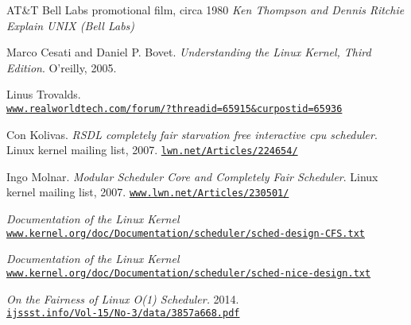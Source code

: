 \documentclass[10pt, oneside]{book}
\begin{document}
\frontmatter
\begin{titlepage}

\end{titlepage}

\tableofcontents
\listoffigures



\mainmatter







\begin{thebibliography}{}
AT\&T Bell Labs promotional film, circa 1980
\textit{Ken Thompson and Dennis Ritchie Explain UNIX (Bell Labs)} %

Marco Cesati and Daniel P. Bovet.
\textit{Understanding the Linux Kernel, Third Edition}.
O'reilly, 2005.

Linus Trovalds.\\
\href{https://www.realworldtech.com/forum/?threadid=65915\&curpostid=65936}{\texttt{www.realworldtech.com/forum/?threadid=65915\&curpostid=65936}}

Con Kolivas.
\textit{RSDL completely fair starvation free interactive cpu scheduler}.
Linux kernel mailing list, 2007.
\href{https://lwn.net/Articles/224654/}{\texttt{lwn.net/Articles/224654/}}

Ingo Molnar.
\textit{Modular Scheduler Core and Completely Fair Scheduler}.
Linux kernel mailing list, 2007. 
\href{https://www.lwn.net/Articles/230501/}{\texttt{www.lwn.net/Articles/230501/}}

\textit{Documentation of the Linux Kernel}\\
\href{https://www.kernel.org/doc/Documentation/scheduler/sched-design-CFS.txt}{\texttt{www.kernel.org/doc/Documentation/scheduler/sched-design-CFS.txt}}

\textit{Documentation of the Linux Kernel}\\
\href{https://www.kernel.org/doc/Documentation/scheduler/sched-nice-design.txt}{\texttt{www.kernel.org/doc/Documentation/scheduler/sched-nice-design.txt}}

\textit{On the Fairness of Linux O(1) Scheduler.} 2014.\\
\href{http://ijssst.info/Vol-15/No-3/data/3857a668.pdf}{\texttt{ijssst.info/Vol-15/No-3/data/3857a668.pdf}}


\end{thebibliography}
\end{document}
